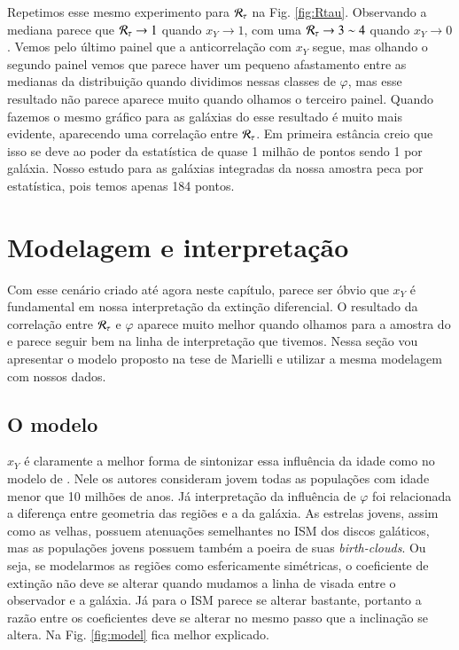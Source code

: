 Repetimos esse mesmo experimento para $\mathcal{R}_\tau$ na Fig. \ref{fig:Rtau}. Observando a mediana parece
que $\mathcal{R}_\tau \to 1$ quando $x_Y \to 1$, com uma $\mathcal{R}_\tau \to 3 \sim 4$ quando $x_Y \to 0$. Vemos pelo
último painel que a anticorrelação com $x_Y$ segue, mas olhando o segundo painel vemos que parece
haver um pequeno afastamento entre as medianas da distribuição quando dividimos nessas classes de
$\varphi$, mas esse resultado não parece aparece muito quando olhamos o terceiro painel. Quando
fazemos o mesmo gráfico para as galáxias do \SDSS esse resultado é muito mais evidente, aparecendo
uma correlação entre $\mathcal{R}_\tau$. Em primeira estância creio que isso se deve ao poder da estatística de
quase 1 milhão de pontos sendo 1 por galáxia. Nosso estudo para as galáxias integradas da nossa
amostra peca por estatística, pois temos apenas 184 pontos.

\section{Modelagem e interpretação}
\label{sec:difextin:modeleinterp}
Com esse cenário criado até agora neste capítulo, parece ser óbvio que $x_Y$ é fundamental em nossa
interpretação da extinção diferencial. O resultado da correlação entre $\mathcal{R}_\tau$ e $\varphi$ aparece
muito melhor quando olhamos para a amostra do \SDSS e parece seguir bem na linha de interpretação
que tivemos. Nessa seção vou apresentar o modelo proposto na tese de Marielli e utilizar a mesma
modelagem com nossos dados.

\subsection{O modelo}
\label{sec:difextin:modeleinterp:model}

$x_Y$ é claramente a melhor forma de sintonizar essa influência da idade como no modelo de
\citet{Charlot.Fall.2000a}. Nele os autores consideram jovem todas as populações com idade menor que
10 milhões de anos. Já interpretação da influência de $\varphi$ foi relacionada a diferença entre
geometria das regiões \Hii e a da galáxia. As estrelas jovens, assim como as velhas, possuem
atenuações semelhantes no ISM dos discos galáticos, mas as populações jovens possuem também a poeira
de suas {\em birth-clouds}. Ou seja, se modelarmos as regiões \Hii como esfericamente simétricas, o
coeficiente de extinção não deve se alterar quando mudamos a linha de visada entre o observador e a
galáxia. Já para o ISM parece se alterar bastante, portanto a razão entre os coeficientes deve se
alterar no mesmo passo que a inclinação se altera. Na Fig. \ref{fig:model}  fica melhor explicado.

